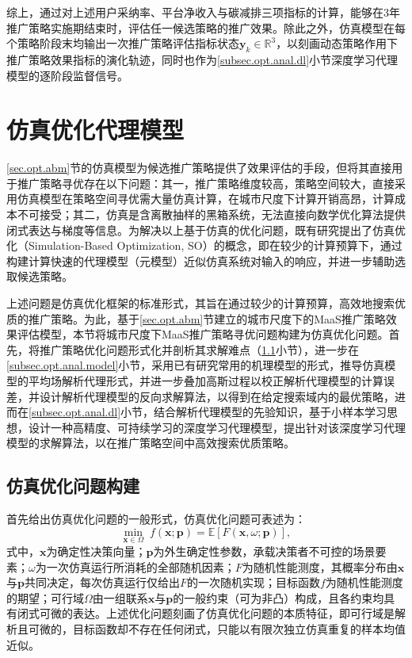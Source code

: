 综上，通过对上述用户采纳率、平台净收入与碳减排三项指标的计算，能够在3年推广策略实施期结束时，评估任一候选策略的推广效果。除此之外，仿真模型在每个策略阶段末均输出一次推广策略评估指标状态$\bm{y}_{k}\in\mathbb{R}^{3}$，以刻画动态策略作用下推广策略效果指标的演化轨迹，同时也作为\ref{subsec.opt.anal.dl}小节深度学习代理模型的逐阶段监督信号。

\section{仿真优化代理模型}\label{sec.opt.anal}

\ref{sec.opt.abm}节的仿真模型为候选推广策略提供了效果评估的手段，但将其直接用于推广策略寻优存在以下问题：其一，推广策略维度较高，策略空间较大，直接采用仿真模型在策略空间寻优需大量仿真计算，在城市尺度下计算开销高昂，计算成本不可接受；其二，仿真是含离散抽样的黑箱系统，无法直接向数学优化算法提供闭式表达与梯度等信息。为解决以上基于仿真的优化问题，既有研究提出了仿真优化（Simulation-Based Optimization, SO）\citep{osorioSimulationBasedOptimizationFramework2013}的概念，即在较少的计算预算下，通过构建计算快速的代理模型（元模型）近似仿真系统对输入的响应，并进一步辅助选取候选策略。

上述问题是仿真优化\citep{osorioSimulationBasedOptimizationFramework2013}框架的标准形式，其旨在通过较少的计算预算，高效地搜索优质的推广策略。为此，基于\ref{sec.opt.abm}节建立的城市尺度下的MaaS推广策略效果评估模型，本节将城市尺度下MaaS推广策略寻优问题构建为仿真优化问题。首先，将推广策略优化问题形式化并剖析其求解难点（\ref{subsec.opt.anal.problem}小节），进一步在\ref{subsec.opt.anal.model}小节，采用已有研究常用的机理模型的形式，推导仿真模型的平均场解析代理形式，并进一步叠加高斯过程以校正解析代理模型的计算误差，并设计解析代理模型的反向求解算法，以得到在给定搜索域内的最优策略，进而在\ref{subsec.opt.anal.dl}小节，结合解析代理模型的先验知识，基于小样本学习思想，设计一种高精度、可持续学习的深度学习代理模型，提出针对该深度学习代理模型的求解算法，以在推广策略空间中高效搜索优质策略。

\subsection{仿真优化问题构建} \label{subsec.opt.anal.problem}

首先给出仿真优化问题的一般形式，仿真优化问题可表述为\citep{osorioSimulationBasedOptimizationFramework2013}：
\begin{equation}
\min_{\bm{x}\in\Omega}\; f\left(\bm{x};\bm{p}\right)=\mathbb{E}\left[F\left(\bm{x},\omega;\bm{p}\right)\right],
\label{eq.opt.sogeneral}
\end{equation}
式中，$\bm{x}$为确定性决策向量；$\bm{p}$为外生确定性参数，承载决策者不可控的场景要素；$\omega$为一次仿真运行所消耗的全部随机因素；$F$为随机性能测度，其概率分布由$\bm{x}$与$\bm{p}$共同决定，每次仿真运行仅给出$F$的一次随机实现；目标函数$f$为随机性能测度的期望；可行域$\Omega$由一组联系$\bm{x}$与$\bm{p}$的一般约束（可为非凸）构成，且各约束均具有闭式可微的表达。上述优化问题刻画了仿真优化问题的本质特征，即可行域是解析且可微的，目标函数却不存在任何闭式，只能以有限次独立仿真重复的样本均值近似。

